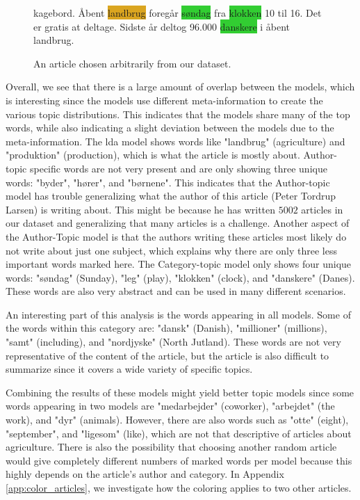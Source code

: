 \begin{figure}
\begin{tcolorbox}
{kagebord. Åbent \colorbox{Goldenrod}{landbrug} foregår \colorbox{LimeGreen}{søndag} fra \colorbox{LimeGreen}{klokken} 10 til 16. Det er gratis at deltage. Sidste år deltog 96.000 \colorbox{LimeGreen}{danskere} i åbent landbrug.
		}
	\end{tcolorbox}
	\caption{An article chosen arbitrarily from our dataset.}
	\label{fig:the_article}
\end{figure}

Overall, we see that there is a large amount of overlap between the models, which is interesting since the models use different meta-information to create the various topic distributions.
This indicates that the models share many of the top words, while also indicating a slight deviation between the models due to the meta-information.
The \gls{lda} model shows words like "landbrug" (agriculture) and "produktion" (production), which is what the article is mostly about.
Author-topic specific words are not very present and are only showing three unique words: "byder", "hører", and "børnene".
This indicates that the Author-topic model has trouble generalizing what the author of this article (Peter Tordrup Larsen) is writing about. 
This might be because he has written $5002$ articles in our dataset and generalizing that many articles is a challenge.
Another aspect of the Author-Topic model is that the authors writing these articles most likely do not write about just one subject, which explains why there are only three less important words marked here. 
The Category-topic model only shows four unique words: "søndag" (Sunday), "leg" (play), "klokken" (clock), and "danskere" (Danes).
These words are also very abstract and can be used in many different scenarios.

An interesting part of this analysis is the words appearing in all models.
Some of the words within this category are: "dansk" (Danish), "millioner" (millions), "samt" (including), and "nordjyske" (North Jutland).
These words are not very representative of the content of the article, but the article is also difficult to summarize since it covers a wide variety of specific topics.

Combining the results of these models might yield better topic models since some words appearing in two models are "medarbejder" (coworker), "arbejdet" (the work), and "dyr" (animals).
However, there are also words such as "otte" (eight), "september", and "ligesom" (like), which are not that descriptive of articles about agriculture. 
There is also the possibility that choosing another random article would give completely different numbers of marked words per model because this highly depends on the article's author and category.
In Appendix \autoref{app:color_articles}, we investigate how the coloring applies to two other articles.




